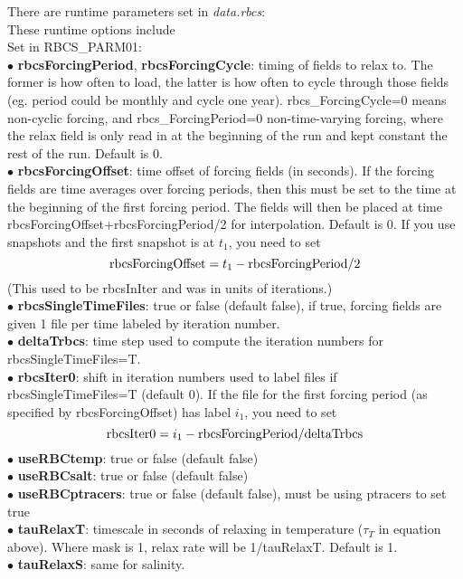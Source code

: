 \noindent
There are runtime parameters
set in {\it data.rbcs}:\\
These runtime options include\\
Set in {RBCS\_PARM01}:\\
$\bullet$ {\bf rbcsForcingPeriod}, {\bf rbcsForcingCycle}: timing of
fields to relax to.
The former is how often to load, the latter is how often to cycle
through those fields (eg. period could be monthly and cycle one year).
rbcs\_ForcingCycle=0 means non-cyclic forcing, and
rbcs\_ForcingPeriod=0 non-time-varying forcing, where the relax field
is only read in at the beginning of the run and kept constant
the rest of the run. Default is 0.
\\
$\bullet$  {\bf rbcsForcingOffset}: time offset of forcing fields (in seconds).
If the forcing fields are time averages over forcing periods,
then this must be set to the time at the beginning of the
first forcing period.  The fields will then be placed at time
rbcsForcingOffset+rbcsForcingPeriod/2 for interpolation.  Default is 0.
If you use snapshots and the first snapshot is at $t_1$, you need to set
\[
  {\rm rbcsForcingOffset} = t_1 - {\rm rbcsForcingPeriod}/2
\]
(This used to be rbcsInIter and was in units of iterations.)\\
$\bullet$  {\bf rbcsSingleTimeFiles}: true or false (default false),
if true, forcing fields are given 1 file per time labeled by iteration number.\\
$\bullet$  {\bf deltaTrbcs}: time step used to compute the iteration numbers
for rbcsSingleTimeFiles=T.\\
$\bullet$  {\bf rbcsIter0}: shift in iteration numbers used to label files if
rbcsSingleTimeFiles=T (default 0).  If the file for the first forcing period
(as specified by rbcsForcingOffset) has label $i_1$, you need to set
\[
  {\rm rbcsIter0} = i_1 - {\rm rbcsForcingPeriod}/{\rm deltaTrbcs}
\]
$\bullet$  {\bf useRBCtemp}: true or false (default false)\\
$\bullet$  {\bf useRBCsalt}: true or false (default false)\\
$\bullet$  {\bf useRBCptracers}: true or false (default false), must be using
ptracers to set true\\
$\bullet$  {\bf tauRelaxT}: timescale in seconds of relaxing
in temperature ($\tau_T$ in equation above). 
Where mask is 1, relax rate will be
1/tauRelaxT. Default is 1.\\
$\bullet$  {\bf tauRelaxS}: same for salinity.\\
